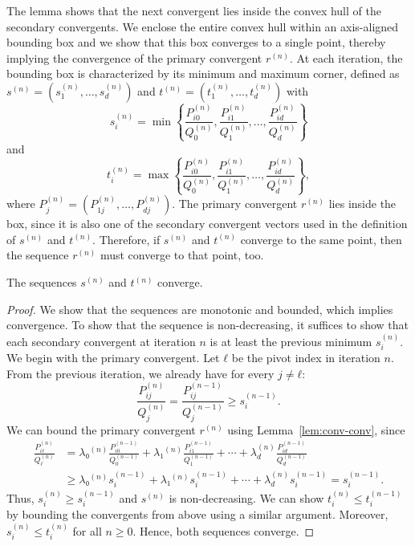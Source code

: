 The lemma shows that the next convergent lies inside the convex hull of the secondary convergents.
We enclose the entire convex hull within an axis-aligned bounding box
and we show that this box converges to a single point,
thereby implying the convergence of the primary convergent $r^{(n)}$.
At each iteration, the bounding box is characterized by its minimum and maximum corner,
defined as $s^{(n)} = (s_1^{(n)}, …, s_d^{(n)})$ and $t^{(n)} = (t_1^{(n)}, …, t_d^{(n)})$ with
\[
  s_i^{(n)} = \min\left\{\frac{P_{i0}^{(n)}}{Q_0^{(n)}}, \frac{P_{i1}^{(n)}}{Q_1^{(n)}}, …, \frac{P_{id}^{(n)}}{Q_d^{(n)}}\right\}
\]
and
\[
  t_i^{(n)} = \max\left\{\frac{P_{i0}^{(n)}}{Q_0^{(n)}}, \frac{P_{i1}^{(n)}}{Q_1^{(n)}}, …, \frac{P_{id}^{(n)}}{Q_d^{(n)}}\right\},
\]
where $P_j^{(n)} = (P_{1j}^{(n)}, …, P_{dj}^{(n)})$.
The primary convergent $r^{(n)}$ lies inside the box,
since it is also one of the secondary convergent vectors
used in the definition of $s^{(n)}$ and $t^{(n)}$.
Therefore, if $s^{(n)}$ and $t^{(n)}$ converge to the same point,
then the sequence $r^{(n)}$ must converge to that point, too.

\begin{lemma}
  The sequences $s^{(n)}$ and $t^{(n)}$ converge.
\end{lemma}

\begin{proof}
  We show that the sequences are monotonic and bounded, which implies convergence.
  To show that the sequence is non-decreasing,
  it suffices to show that each secondary convergent at iteration $n$
  is at least the previous minimum $s_i^{(n)}$.
  We begin with the primary convergent.
  Let $ℓ$ be the pivot index in iteration $n$.
  From the previous iteration, we already have for every $j ≠ ℓ$:
  \[
    \frac{P_{ij}^{(n)}}{Q_j^{(n)}} = \frac{P_{ij}^{(n-1)}}{Q_j^{(n-1)}} ≥ s_i^{(n-1)}.
  \]
  We can bound the primary convergent $r^{(n)}$ using Lemma~\ref{lem:conv-conv}, since
  \begin{align*}
    \frac{P_{iℓ}^{(n)}}{Q_ℓ^{(n)}}
    & = λ₀^{(n)} \frac{P_{i0}^{(n-1)}}{Q_0^{(n-1)}} + λ₁^{(n)} \frac{P_{i1}^{(n-1)}}{Q_1^{(n-1)}} + ⋯ + λ_d^{(n)} \frac{P_{id}^{(n-1)}}{Q_d^{(n-1)}} \\
    & ≥ λ₀^{(n)} s_i^{(n-1)} + λ₁^{(n)} s_i^{(n-1)} + ⋯ + λ_d^{(n)} s_i^{(n-1)}
      = s_i^{(n-1)}.
  \end{align*}
  Thus, $s_i^{(n)} ≥ s_i^{(n-1)}$ and $s^{(n)}$ is non-decreasing.
  We can show $t_i^{(n)} ≤ t_i^{(n-1)}$ by bounding the convergents from above using a similar argument.
  Moreover, $s_i^{(n)} ≤ t_i^{(n)}$ for all $n ≥ 0$.
  Hence, both sequences converge.
\end{proof}

